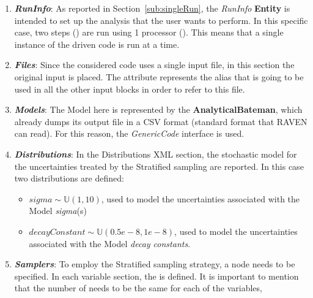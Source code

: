 \begin{enumerate}
   \item \textbf{\textit{RunInfo}}:
   As reported in Section~\ref{sub:singleRun}, the \textit{RunInfo} \textbf{Entity} is intended to set up the analysis
   that the user wants to perform. In this specific case, two steps () are  run
   using 1 processor (). This means that 
   a single instance of the driven code is run at a time.
   \item \textbf{\textit{Files}}:
   Since the considered code uses a single input file, in this section the original input is placed.
   The attribute   represents the alias that is going to be used in all the other input blocks in order to refer to this file.
   \item \textbf{\textit{Models}}:
 The Model here is represented by the
 \textbf{AnalyticalBateman}, which already dumps its output file in a
 CSV format (standard format that RAVEN can read). For this reason,
 the \textit{GenericCode} interface is used.
   \item \textbf{\textit{Distributions}}:
  In the Distributions XML section, the stochastic model for the
  uncertainties  treated by the Stratified sampling are reported. In
  this case two distributions are defined:
  \begin{itemize}
    \item $sigma \sim \mathbb{U}(1,10)$, used to model the uncertainties
    associated with  the Model \textit{sigma}(s)
    \item  $decayConstant \sim \mathbb{U}(0.5e-8,1e-8)$,  used to
    model the uncertainties
    associated with  the Model \textit{decay constants}.
  \end{itemize}
   \item \textbf{\textit{Samplers}}:
  To employ the Stratified sampling strategy, a
   node needs to be specified. In each variable section, the   is defined.
  It is important to mention that the number of  needs to be the same for each of the variables,

\end{enumerate}

